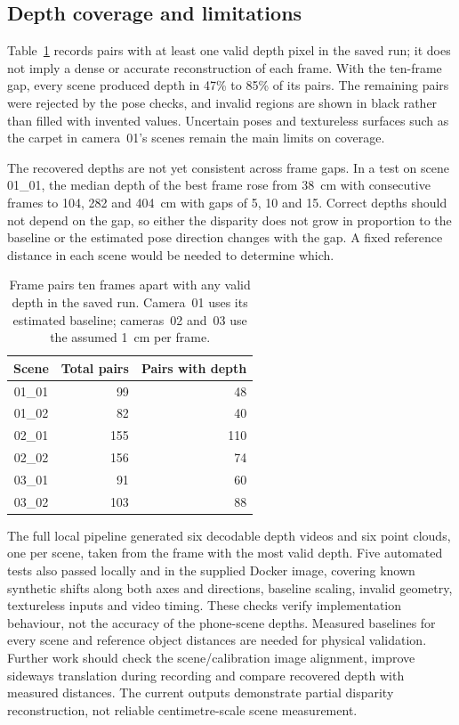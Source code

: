 \documentclass[conference]{IEEEtran}
\begin{document}
\subsection{Depth coverage and limitations}
Table~\ref{tab:depth} records pairs with at least one valid depth pixel in the saved run; it does not imply a dense or accurate reconstruction of each frame. With the ten-frame gap, every scene produced depth in 47\% to 85\% of its pairs. The remaining pairs were rejected by the pose checks, and invalid regions are shown in black rather than filled with invented values. Uncertain poses and textureless surfaces such as the carpet in camera~01's scenes remain the main limits on coverage.

The recovered depths are not yet consistent across frame gaps. In a test on scene 01\_01, the median depth of the best frame rose from 38~cm with consecutive frames to 104, 282 and 404~cm with gaps of 5, 10 and 15. Correct depths should not depend on the gap, so either the disparity does not grow in proportion to the baseline or the estimated pose direction changes with the gap. A fixed reference distance in each scene would be needed to determine which.

\begin{table}[htbp]
\caption{Frame pairs ten frames apart with any valid depth in the saved run. Camera~01 uses its estimated baseline; cameras~02 and~03 use the assumed 1~cm per frame.}
\label{tab:depth}
\centering
\begin{tabular}{c r r}
\hline
Scene & Total pairs & Pairs with depth \\
\hline
01\_01 & 99 & 48 \\
01\_02 & 82 & 40 \\
02\_01 & 155 & 110 \\
02\_02 & 156 & 74 \\
03\_01 & 91 & 60 \\
03\_02 & 103 & 88 \\
\hline
\end{tabular}
\end{table}

The full local pipeline generated six decodable depth videos and six point clouds, one per scene, taken from the frame with the most valid depth. Five automated tests also passed locally and in the supplied Docker image, covering known synthetic shifts along both axes and directions, baseline scaling, invalid geometry, textureless inputs and video timing. These checks verify implementation behaviour, not the accuracy of the phone-scene depths. Measured baselines for every scene and reference object distances are needed for physical validation. Further work should check the scene/calibration image alignment, improve sideways translation during recording and compare recovered depth with measured distances. The current outputs demonstrate partial disparity reconstruction, not reliable centimetre-scale scene measurement.

\printbibliography
\end{document}
